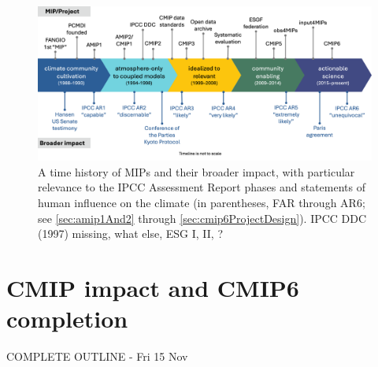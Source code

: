 \documentclass[gmd, preprint]{copernicus}
\def\cred#1{{\color{red}#1}}
\def\cblue#1{{\color{blue}#1}}
\begin{document}
\begin{figure}
    \centering
    \includegraphics[width=\textwidth]{241115_durack1-AMIP-CMIP-IPCC-Impact-trim-large.png}
    \caption{A time history of MIPs and their broader impact, with particular relevance to the IPCC Assessment Report phases and statements of human influence on the climate (in parentheses, FAR through AR6; see \autoref{sec:amip1And2} through \autoref{sec:cmip6ProjectDesign}). \cred{IPCC DDC (1997) missing, what else, ESG I, II, ?}}
    \label{fig:fig6-MIPImpact}
\end{figure}


\section{CMIP impact and CMIP6 completion}
\label{sec:CMIP6Completion}
\cblue{COMPLETE OUTLINE - Fri 15 Nov}
\end{document}
